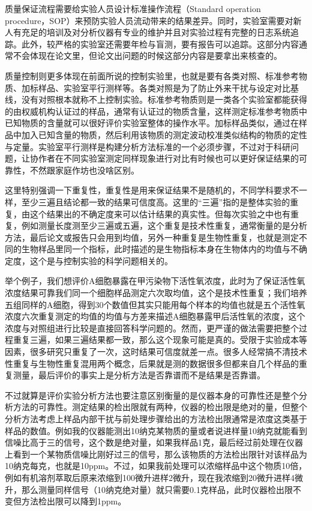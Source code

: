 \documentclass[]{tufte-book}
\begin{document}
质量保证流程需要给实验人员设计标准操作流程（Standard operation procedure，SOP）来预防实验人员流动带来的结果差异。同时，实验室需要对新人有充足的培训及对分析仪器有专业的维护并且对实验过程有完整的日志系统追踪。此外，较严格的实验室还需要年检与盲测，要有报告可以追踪。这部分内容通常不会体现在论文里，但论文出问题的时候这部分内容是要拿出来核查的。

质量控制则更多体现在前面所说的控制实验里，也就是要有各类对照、标准参考物质、加标样品、实验室平行测样等。各类对照是为了防止外来干扰与设定对比基线，没有对照根本就称不上控制实验。标准参考物质则是一类各个实验室都能获得的由权威机构认证过的样品，通常有认证过的物质含量，这样测定标准参考物质中已知物质的含量就可以很好评价实验室整体的操作水平。加标样品类似，通过在样品中加入已知含量的物质，然后利用该物质的测定波动校准类似结构的物质的定性与定量。实验室平行测样是构建分析方法标准的一个必须步骤，不过对于科研问题，让协作者在不同实验室测定同样现象进行对比有时候也可以更好保证结果的可靠性，不然跟家庭作坊也没啥区别。

这里特别强调一下重复性，重复性是用来保证结果不是随机的，不同学科要求不一样，至少三遍且结论都一致的结果可信度高。这里的``三遍''指的是整体实验的重复，由这个结果出的不确定度来可以估计结果的真实性。但每次实验之中也有重复，例如测量长度测至少三遍或五遍，这个重复是技术性重复，通常衡量的是分析方法，最后论文或报告只会用到均值，另外一种重复是生物性重复，也就是测定不同的生物样品里同一个指标，此时描述的是生物指标本身在生物体内的均值与不确定度，这个是与控制实验的科学问题相关的。

举个例子，我们想评价A细胞暴露在甲污染物下活性氧浓度，此时为了保证活性氧浓度结果可靠我们同一个细胞样品测定六次取均值，这个是技术性重复；我们培养五组同样的A细胞，得到30个数值但其实只能用每个样本的均值也就是五个活性氧浓度六次重复测定的均值的均值与方差来描述A细胞暴露甲后活性氧的浓度，这个浓度与对照组进行比较是直接回答科学问题的。然而，更严谨的做法需要把整个过程重复三遍，如果三遍结果都一致，那么这个现象可能是真的。受限于实验成本等因素，很多研究只重复了一次，这时结果可信度就差一点。很多人经常搞不清技术性重复与生物性重复混用两个概念，后果就是测的数据很多但都来自几个样品的重复测量，最后评价的事实上是分析方法是否靠谱而不是结果是否靠谱。

不过就算是评价实验分析方法也要注意区别衡量的是仪器本身的可靠性还是整个分析方法的可靠性。测定结果的检出限就有两种，仪器的检出限是绝对的量，但整个分析方法考虑上样品内部干扰与前处理步骤给出的方法检出限通常是浓度这类基于样品的数值。例如我的仪器能测出10纳克某物质的量或者说进样量10纳克就能看到信噪比高于三的信号，这个数是绝对量，如果我样品1克，最后经过前处理在仪器上看到一个某物质信噪比刚好过三的信号，那么该物质的方法检出限针对该样品为10纳克每克，也就是10ppm。不过，如果我前处理可以浓缩样品中这个物质10倍，例如有机溶剂萃取后原来浓缩到100微升进样2微升，现在我浓缩到20微升进样4微升，那么测量同样信号（10纳克绝对量）就只需要0.1克样品，此时仪器检出限不变但方法检出限可以降到1ppm。
\end{document}
